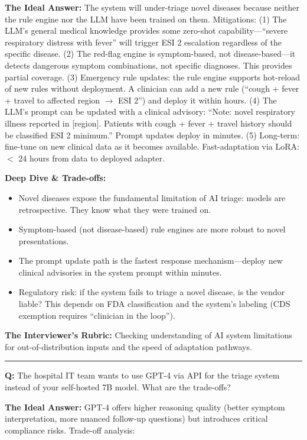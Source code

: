 \textbf{The Ideal Answer:} The system will under-triage novel diseases because neither the rule engine nor the LLM have been trained on them. Mitigations: (1) The LLM's general medical knowledge provides some zero-shot capability---``severe respiratory distress with fever'' will trigger ESI 2 escalation regardless of the specific disease. (2) The red-flag engine is symptom-based, not disease-based---it detects dangerous symptom combinations, not specific diagnoses. This provides partial coverage. (3) Emergency rule updates: the rule engine supports hot-reload of new rules without deployment. A clinician can add a new rule (``cough + fever + travel to affected region $\rightarrow$ ESI 2'') and deploy it within hours. (4) The LLM's prompt can be updated with a clinical advisory: ``Note: novel respiratory illness reported in [region]. Patients with cough + fever + travel history should be classified ESI 2 minimum.'' Prompt updates deploy in minutes. (5) Long-term: fine-tune on new clinical data as it becomes available. Fast-adaptation via LoRA: $<$ 24 hours from data to deployed adapter.

\textbf{Deep Dive \& Trade-offs:}
\begin{itemize}
  \item Novel diseases expose the fundamental limitation of AI triage: models are retrospective. They know what they were trained on.
  \item Symptom-based (not disease-based) rule engines are more robust to novel presentations.
  \item The prompt update path is the fastest response mechanism---deploy new clinical advisories in the system prompt within minutes.
  \item Regulatory risk: if the system fails to triage a novel disease, is the vendor liable? This depends on FDA classification and the system's labeling (CDS exemption requires ``clinician in the loop'').
\end{itemize}

\textbf{The Interviewer's Rubric:} Checking understanding of AI system limitations for out-of-distribution inputs and the speed of adaptation pathways.

\bigskip\hrule\bigskip

\textbf{Q:} The hospital IT team wants to use GPT-4 via API for the triage system instead of your self-hosted 7B model. What are the trade-offs?

\textbf{The Ideal Answer:} GPT-4 offers higher reasoning quality (better symptom interpretation, more nuanced follow-up questions) but introduces critical compliance risks. Trade-off analysis:


